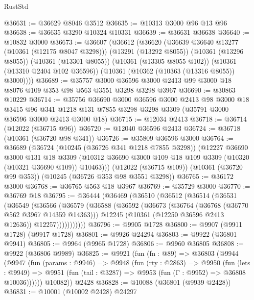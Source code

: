 \begin{lexlean}{RustStd}
\begin{coremodule}
@36631 := @36629 @8046 @3512
@36635 := @10313 @3000 @96 @13 @96
@36638 := @36635 @3290 @10324 @10331
@36639 := @36631 @36638
@36640 := @10832 @3000
@36673 := @36607
    (@36612
      (@36620
        (@36639 @36640 @13277 (@10361 (@12175 @8047 @3298)))
        (@13291 (@13292 @8055))
        (@10361 (@13296 @8055))
        (@10361 (@13301 @8055))
        (@10361 (@13305 @8055 @102))
        (@10361 (@13310 @2404 @102 @36596))
        (@10361 (@10362 (@10363 (@13316 @8055)) @3000))))
@36689 := @35757
    @3000
    @36596
    @3000
    @2413
    @99
    @3000
    @18
    @8076
    @109
    @353
    @98
    @563
    @3551
    @3298
    @3298
    @3967
@36690 := @30863 @10229
@36714 := @35756
    @36690
    @3000
    @36596
    @3000
    @2413
    @98
    @3000
    @18
    @3415
    @96
    @341
    @1218
    @131
    @7855
    @3298
    @3298
    @3309
    (@35791 @3000 @36596 @3000 @2413 @3000 @18)
@36715 := @12034 @2413
@36718 := @36714 (@12022 (@36715 @96))
@36720 := @12040 @36596 @2413
@36724 := @36718 (@10361 (@36720 @98 @341))
@36726 := @35809 @36596 @3000
@36764 := @36689
    (@36724
      (@10245 (@36726 @341 @1218 @7855 @3298))
      (@12227
        @36690
        @3000
        @131
        @18
        @3309
        (@10312 @36690 @3000 @109 @18 @109 @3309 (@10320 (@10321 @36690 @109)) @10463)))
    (@12022 (@36715 @109))
    (@10361 (@36720 @99 @353))
    (@10245 (@36726 @353 @98 @3551 @3298))
@36765 := @36172 @3000
@36768 := @36765 @563 @18 @3967
@36769 := @35729 @3000
@36770 := @36769 @18
@36795 := @36444
    (@36469
      (@36510
        (@36512
          (@36514
            (@36531
              (@36549
                (@36566
                  (@36579
                    (@36588
                      (@36592
                        (@36673
                          (@36764 (@36768 (@36770 @562 @3967 @14359 @14363)))
                          @12245
                          (@10361 (@12250 @36596 @2413 @12636))
                          @12257)))))))))))
@36796 := @9905 @1728
@36800 := @9907 (@9911 @1728) (@9917 @1728)
@36801 := @9926 @24294
@36803 := @9922 (@36801 @9941)
@36805 := @9964 (@9965 @1728)
@36806 := @9960 @36805
@36808 := @9922 (@36806 @9989)
@36825 := @9921
    (fun (fn : @89) =>
    @36803
      (@9944
        (@9947
          (fun (params : @9946) =>
          @9948
            (fun (rty : @2863) =>
            @9950
              (fun (lets : @9949) =>
              @9951 (fun (tail : @3287) => @9953 (fun (Γ : @9952) => @36808 @10036))))))
        @10082))
    @2428
@36828 := @10088 (@36801 (@9939 @2428))
@36831 := @10001 (@10002 @2428) @24297

\end{coremodule}
\end{lexlean}
